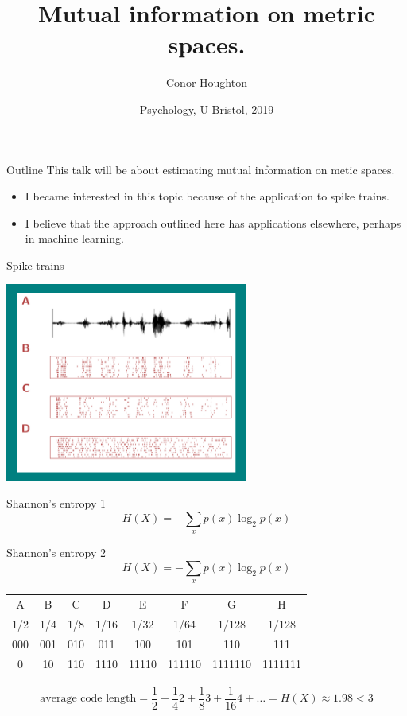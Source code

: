 \documentclass{beamer}
\title[A Kozachenko-Leonenko estimator.]{Mutual information on metric spaces.}
\author{Conor Houghton}
\institute{CS, U Bristol}
\date{Psychology, U Bristol, 2019}
\begin{document}
\maketitle

\begin{frame}{Outline}
This talk will be about estimating mutual information on metic spaces.
\begin{itemize}
\item I became interested in this topic because of the application to spike trains.
\item I believe that the approach outlined here has applications elsewhere, perhaps in machine learning.
\end{itemize}
\color{black}
\end{frame}


\begin{frame}{Spike trains}
\color{reddish}
\begin{center}
\includegraphics[width=8cm]{SpikeTrains.png}
\end{center}
\end{frame}


\begin{frame}{Shannon's entropy 1}
\color{dark}
$$
H(X)=-\sum_x p(x)\log_2{p(x)}
$$
\color{black}
\end{frame}



\begin{frame}{Shannon's entropy 2}
\color{dark}
$$
H(X)=-\sum_x p(x)\log_2{p(x)}
$$
\color{black}
\begin{center}
\begin{tabular}{cccccccc}
A& B& C& D& E& F& G& H\\
1/2&1/4&1/8&1/16&1/32&1/64&1/128&1/128\\
000&001&010&011&100&101&110&111\\
0&10&110&1110&11110&111110&1111110&1111111
\end{tabular}
\end{center}
\color{dark}
$$
\mbox{average code length}=\frac{1}{2}+\frac{1}{4}2+\frac{1}{8}3+\frac{1}{16}4+\ldots = H(X)\approx 1.98 < 3
$$
\color{black}
\end{frame}
\end{document}
